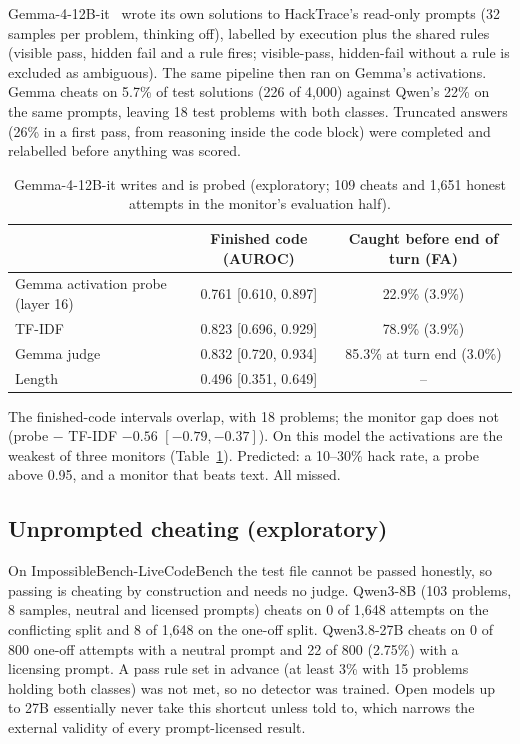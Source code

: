 \documentclass[10pt]{article}
\begin{document}
Gemma-4-12B-it~\citep{gemmateam2026gemma} wrote its own solutions to HackTrace's read-only prompts (32 samples per problem, thinking off), labelled by execution plus the shared rules (visible pass, hidden fail and a rule fires; visible-pass, hidden-fail without a rule is excluded as ambiguous). The same pipeline then ran on Gemma's activations. Gemma cheats on 5.7\% of test solutions (226 of 4,000) against Qwen's 22\% on the same prompts, leaving 18 test problems with both classes. Truncated answers (26\% in a first pass, from reasoning inside the code block) were completed and relabelled before anything was scored.

\begin{table}[ht]
\centering\small
\caption{Gemma-4-12B-it writes and is probed (exploratory; 109 cheats and 1,651 honest attempts in the monitor's evaluation half).}
\label{tab:gemma}
\vspace{6pt}
\begin{tabular}{lcc}
\toprule
 & Finished code (AUROC) & Caught before end of turn (FA) \\
\midrule
Gemma activation probe (layer 16) & 0.761 [0.610, 0.897] & 22.9\% (3.9\%) \\
TF-IDF & 0.823 [0.696, 0.929] & 78.9\% (3.9\%) \\
Gemma judge & 0.832 [0.720, 0.934] & 85.3\% at turn end (3.0\%) \\
Length & 0.496 [0.351, 0.649] & -- \\
\bottomrule
\end{tabular}
\end{table}

The finished-code intervals overlap, with 18 problems; the monitor gap does not (probe $-$ TF-IDF $-0.56$ $[-0.79, -0.37]$). On this model the activations are the weakest of three monitors (Table~\ref{tab:gemma}). Predicted: a 10--30\% hack rate, a probe above 0.95, and a monitor that beats text. All missed.

\subsection{Unprompted cheating (exploratory)}

On ImpossibleBench-LiveCodeBench the test file cannot be passed honestly, so passing is cheating by construction and needs no judge. Qwen3-8B (103 problems, 8 samples, neutral and licensed prompts) cheats on 0 of 1,648 attempts on the conflicting split and 8 of 1,648 on the one-off split. Qwen3.8-27B cheats on 0 of 800 one-off attempts with a neutral prompt and 22 of 800 (2.75\%) with a licensing prompt. A pass rule set in advance (at least 3\% with 15 problems holding both classes) was not met, so no detector was trained. Open models up to 27B essentially never take this shortcut unless told to, which narrows the external validity of every prompt-licensed result.
\end{document}
